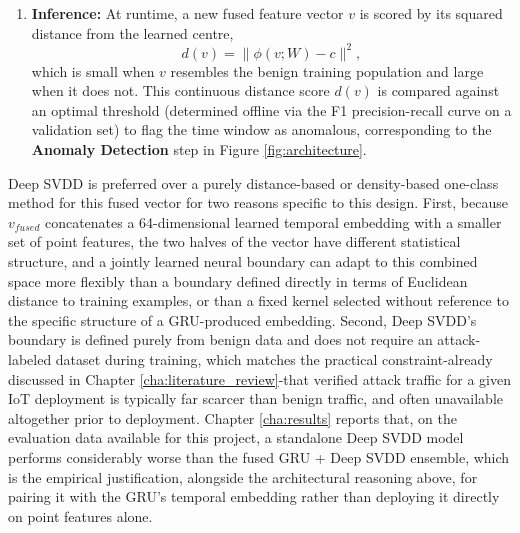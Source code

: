 \begin{enumerate}
	\item \textbf{Inference:} At runtime, a new fused feature vector $v$ is scored by its squared distance from the learned centre,
	\begin{equation}
	d(v) = \lVert \phi(v; W) - c \rVert^2,
	\label{e:svdd_score}
	\end{equation}
	which is small when $v$ resembles the benign training population and large when it does not. This continuous distance score $d(v)$ is compared against an optimal threshold (determined offline via the F1 precision-recall curve on a validation set) to flag the time window as anomalous, corresponding to the \textbf{Anomaly Detection} step in Figure \ref{fig:architecture}.
\end{enumerate}

Deep SVDD is preferred over a purely distance-based or density-based one-class method for this fused vector for two reasons specific to this design. First, because $v_{fused}$ concatenates a 64-dimensional learned temporal embedding with a smaller set of point features, the two halves of the vector have different statistical structure, and a jointly learned neural boundary can adapt to this combined space more flexibly than a boundary defined directly in terms of Euclidean distance to training examples, or than a fixed kernel selected without reference to the specific structure of a GRU-produced embedding. Second, Deep SVDD's boundary is defined purely from benign data and does not require an attack-labeled dataset during training, which matches the practical constraint-already discussed in Chapter \ref{cha:literature_review}-that verified attack traffic for a given IoT deployment is typically far scarcer than benign traffic, and often unavailable altogether prior to deployment. Chapter \ref{cha:results} reports that, on the evaluation data available for this project, a standalone Deep SVDD model performs considerably worse than the fused GRU + Deep SVDD ensemble, which is the empirical justification, alongside the architectural reasoning above, for pairing it with the GRU's temporal embedding rather than deploying it directly on point features alone.


